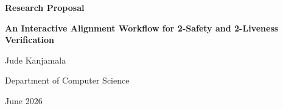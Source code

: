 \documentclass[12pt,letterpaper]{article}
\newcommand{\proposaltitle}{An Interactive Alignment Workflow for
  2-Safety and 2-Liveness Verification}
\newcommand{\proposalauthor}{Jude Kanjamala}
\newcommand{\proposaldate}{June 2026}
\begin{document}
\begin{titlepage}
  \centering
  \vspace*{2cm}

  {\LARGE\bfseries Research Proposal\par}
  \vspace{1.5cm}

  {\large\bfseries \proposaltitle \par}
  \vspace{1.5cm}

  {\large \proposalauthor \par}
  \vspace{0.5cm}

  {\normalsize Department of Computer Science \par}
  \vspace{2cm}


  {\normalsize \proposaldate \par}
\end{titlepage}

\begin{abstract}
\noindent
  This proposal is under preparation.
\end{abstract}

\tableofcontents
\newpage

\end{document}
